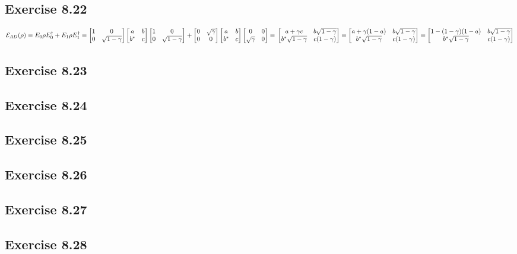 \documentclass[a4paper,12pt]{article}
\begin{document}
\subsection*{Exercise 8.22}
$\mathcal{E}_{AD}(\rho)=E_0\rho E_0^\dagger+E_1\rho E_1^\dagger=
\begin{bmatrix}
    1&0\\
    0&\sqrt{1-\gamma}
\end{bmatrix}
\begin{bmatrix}
    a&b\\
    b^*&c
\end{bmatrix}
\begin{bmatrix}
    1&0\\
    0&\sqrt{1-\gamma}
\end{bmatrix}+
\begin{bmatrix}
    0&\sqrt{\gamma}\\
    0&0
\end{bmatrix}
\begin{bmatrix}
    a&b\\
    b^*&c
\end{bmatrix}
\begin{bmatrix}
    0&0\\
    \sqrt{\gamma}&0
\end{bmatrix}=\\
\begin{bmatrix}
    a+\gamma c & b\sqrt{1-\gamma}\\
    b^*\sqrt{1-\gamma}& c(1-\gamma)
\end{bmatrix}=
\begin{bmatrix}
    a+\gamma(1-a) & b\sqrt{1-\gamma}\\
    b^*\sqrt{1-\gamma}& c(1-\gamma)
\end{bmatrix}=
\begin{bmatrix}
    1-(1-\gamma)(1-a) & b\sqrt{1-\gamma}\\
    b^*\sqrt{1-\gamma}& c(1-\gamma)
\end{bmatrix}$
\subsection*{Exercise 8.23}

\subsection*{Exercise 8.24}
\subsection*{Exercise 8.25}
\subsection*{Exercise 8.26}
\subsection*{Exercise 8.27}
\subsection*{Exercise 8.28}
\end{document}
